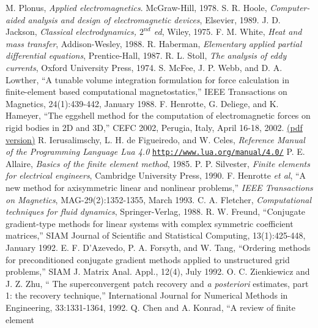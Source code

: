 \begin{thebibliography}{99}
 M. Plonus, {\em Applied electromagnetics}. McGraw-Hill, 1978.
 S. R. Hoole, {\em Computer-aided analysis and design of
electromagnetic devices}, Elsevier, 1989.
 J. D. Jackson, {\em Classical electrodynamics, $2^{nd}$ ed},
Wiley, 1975.
 F. M. White, {\em Heat and mass transfer}, Addison-Wesley, 1988.
 R. Haberman, {\em Elementary applied partial differential equations}, Prentice-Hall, 1987.
 R. L. Stoll, {\em The analysis of eddy currents},
Oxford University Press, 1974.
 S. McFee, J. P. Webb, and D. A. Lowther, ``A
tunable volume integration formulation for force calculation in
finite-element based computational magnetostatics,'' IEEE
Transactions on Magnetics, 24(1):439-442, January 1988.
 F. Henrotte, G. Deliege, and K. Hameyer, ``The
eggshell method for the computation of electromagnetic forces on
rigid bodies in 2D and 3D,'' CEFC 2002, Perugia, Italy, April
16-18, 2002.
\href{http://www.esat.kuleuven.ac.be/electa/publications/fulltexts/pub_942.pdf}{(pdf version)}
 R. Ierusalimschy, L. H. de Figueiredo, and W. Celes,
{\em Reference Manual of the Programming Language Lua 4.0}
\href{http://www.lua.org/manual/4.0/}{\tt http://www.lua.org/manual/4.0/}
 P. E. Allaire, {\em Basics of the finite element
method}, 1985.
 P. P. Silvester, {\em Finite elements for electrical engineers},
Cambridge University Press, 1990.
 F. Henrotte {\em et al}, ``A new method for
axisymmetric linear and nonlinear problems,'' {\em IEEE
Transactions on Magnetics}, MAG-29(2):1352-1355, March 1993.
 C. A. Fletcher, {\em Computational techniques
for fluid dynamics}, Springer-Verlag, 1988.
 R. W. Freund, ``Conjugate gradient-type methods
for linear systems with complex symmetric coefficient matrices,''
SIAM Journal of Scientific and Statistical Computing,
13(1):425-448, January 1992.
 E. F. D'Azevedo, P. A. Forsyth, and W. Tang,
``Ordering methods for preconditioned conjugate gradient methods
applied to unstructured grid problems,'' SIAM J. Matrix Anal.
Appl., 12(4), July 1992.
 O. C. Zienkiewicz and J. Z. Zhu, `` The
superconvergent patch recovery and {\em a posteriori} estimates,
part 1:  the recovery technique,'' International Journal for
Numerical Methods in Engineering, 33:1331-1364, 1992.
 Q. Chen and A. Konrad, ``A review of finite element

\end{thebibliography}
